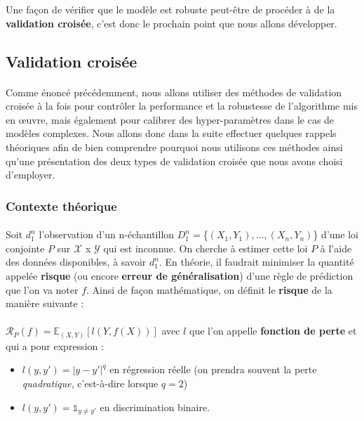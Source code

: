 \documentclass[14pt, openany]{article}
\begin{document}
Une façon de vérifier que le modèle est robuste peut-être de procéder à de la \textbf{validation croisée}, c'est donc le prochain point que nous allons développer.
 
\subsection{Validation croisée}
\paragraph{}
Comme énoncé précédemment, nous allons utiliser des méthodes de validation croisée à la fois pour contrôler la performance et la robustesse de l'algorithme mis en œuvre, mais également pour calibrer des hyper-paramètres dans le cas de modèles complexes. Nous allons donc dans la suite effectuer quelques rappels théoriques afin de bien comprendre pourquoi nous utilisons ces méthodes ainsi qu'une présentation des deux types de validation croisée que nous avons choisi d'employer.

\subsubsection{Contexte théorique}
\paragraph{}
Soit $d^{n}_{1}$ l'observation d'un n-échantillon $D^{n}_{1} =$\{$(X_1,Y_1),...,(X_n,Y_n)$\} d'une loi conjointe $P$ sur $\mathcal{X}$ x $\mathcal{Y}$ qui est inconnue. On cherche à estimer cette loi $P$ à l'aide des données disponibles, à savoir $d^{n}_{1}$. En théorie, il faudrait minimiser la quantité appelée \textbf{risque} (ou encore \textbf{erreur de généralisation}) d'une règle de prédiction que l'on va noter $f$. Ainsi de façon mathématique, on définit le \textbf{risque} de la manière suivante :
\paragraph{}
$\mathcal{R}_P(f) = \mathbb{E}_{(X,Y)}[l(Y,f(X))]$ avec $l$ que l'on appelle \textbf{fonction de perte} et qui a pour expression :
\begin{itemize}
\item $l(y,y') = |y-y'|^q$ en régression réelle (on prendra souvent la perte \textit{quadratique}, c'est-à-dire lorsque $q=2$)
\item $l(y,y') = \mathds{1}_{y \neq y'}$ en discrimination binaire.
\end{itemize}
\end{document}
